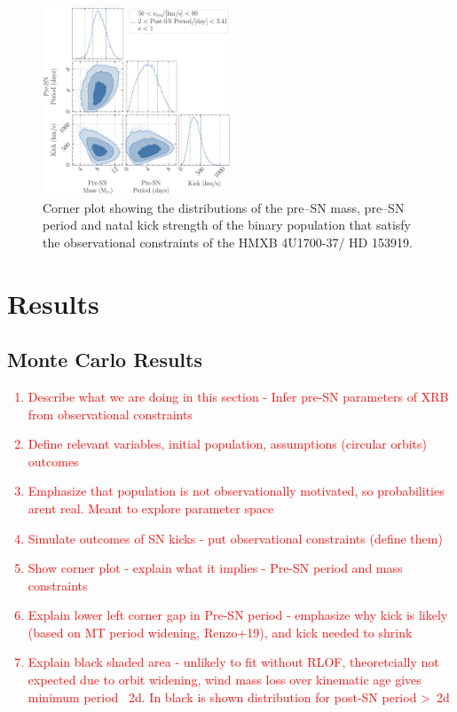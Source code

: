 \documentclass[linenumbers,trackchanges,twocolumn]{aastex701}
\newcommand{\red}{\textcolor{red}}
\begin{document}
\begin{figure}[htbp]
    \centering
    \includegraphics[width=0.5\textwidth]{xrb-monte-carlo-mass-period-kick.pdf}
    \caption{Corner plot showing the distributions of the pre--SN mass, pre--SN period and natal kick strength of the binary population that satisfy the observational constraints of the HMXB 4U1700-37/ HD 153919.}
    \label{fig:xrb_monte_carlo}
\end{figure}

\section{Results}

\subsection{Monte Carlo Results} \label{sec:monte_carlo}

\red{
\begin{enumerate}
    \item Describe what we are doing in this section - Infer pre-SN parameters of XRB from observational constraints
    \item Define relevant variables, initial population, assumptions (circular orbits) outcomes
    \item Emphasize that population is not observationally motivated, so probabilities arent real. Meant to explore parameter space
    \item Simulate outcomes of SN kicks - put observational constraints (define them)
    \item Show corner plot - explain what it implies - Pre-SN period and mass constraints
    \item Explain lower left corner gap in Pre-SN period - emphasize why kick is likely (based on MT period widening, Renzo+19), and kick needed to shrink
    \item Explain black shaded area - unlikely to fit without RLOF, theoretcially not expected due to orbit widening, wind mass loss over kinematic age gives minimum period ~2d. In black is shown distribution for post-SN period >~2d
\end{enumerate}
}
\end{document}
